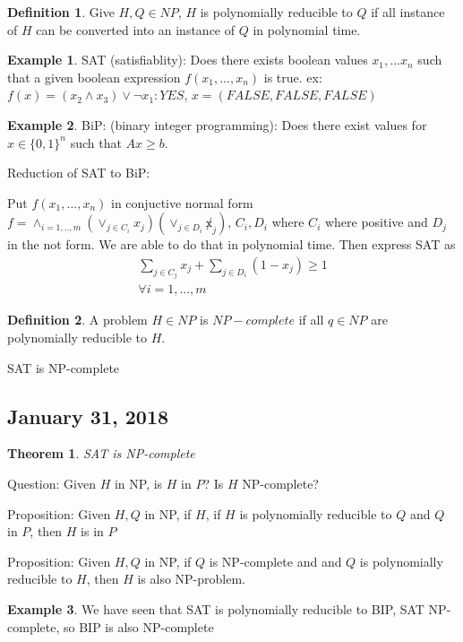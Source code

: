 \documentclass{article}
\theoremstyle{plain}
\newtheorem{thm}{Theorem}
\theoremstyle{definition}
\newtheorem{eg}{Example}
\newtheorem{defn}{Definition}
\begin{document}
\begin{defn}
    Give $H,Q\in NP$, $H$ is polynomially reducible to $Q$ if all instance of $H$
    can be converted into an instance of $Q$ in polynomial time.
\end{defn}

\begin{eg}
    SAT (satisfiablity): Does there exists boolean values $x_1, ... x_n$
    such that a given boolean expression $f(x_1, ..., x_n)$ is true.
    ex: $f(x) = (x_2\land x_3) \lor \lnot x_1: YES$, $x=(FALSE, FALSE, FALSE)$
\end{eg}

\begin{eg}
    BiP: (binary integer programming): Does there exist values for $x\in\{0,1\}^n$
    such that $Ax\geq b$.
\end{eg}

Reduction of SAT to BiP:

Put $f(x_1, ..., x_n)$ in conjuctive normal form
$f = \land_{i=1,..,m} (\lor_{j\in C_i} x_j) (\lor_{j\in D_i} \not x_j)$,
$C_i, D_i$ where $C_i$ where positive and $D_j$ in the not form.
We are able to do that in polynomial time. Then express SAT
as
\begin{align*}
    \sum_{j\in C_j} x_j + \sum_{j\in D_i}(1-x_j) \geq 1\\
    \forall i = 1,...,m
\end{align*}

\begin{defn}
    A problem $H\in NP$ is $NP-complete$ if all $q\in NP$ are polynomially
    reducible to $H$.
\end{defn}

SAT is NP-complete

\subsection{January 31, 2018}
\begin{thm}
    SAT is NP-complete
\end{thm}

Question: Given $H$ in NP, is $H$ in $P$? Is $H$ NP-complete?

Proposition: Given $H,Q$ in NP, if $H$, if $H$ is polynomially
reducible to $Q$ and $Q$ in $P$, then $H$ is in $P$

Proposition: Given $H, Q$ in NP, if $Q$ is NP-complete and and
$Q$ is polynomially reducible to $H$, then $H$ is also
NP-problem.

\begin{eg}
    We have seen that SAT is polynomially reducible to BIP,
    SAT NP-complete, so BIP is also NP-complete
\end{eg}
\end{document}
